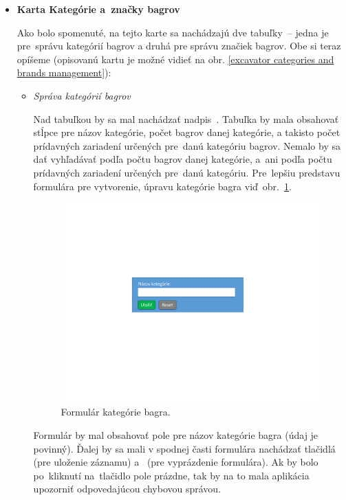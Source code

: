 \begin{itemize}
\item \textbf{Karta Kategórie a~značky bagrov}

Ako bolo spomenuté, na tejto karte sa nachádzajú dve tabuľky~-- jedna je pre~správu kategórií bagrov a druhá pre správu značiek bagrov. Obe si teraz opíšeme (opisovanú kartu je možné vidieť na obr. \ref{excavator categories and brands management}):

\begin{itemize}
\item \textit{Správa kategórií bagrov}

Nad tabuľkou by sa mal nachádzať nadpis~. Tabuľka by mala obsahovať stĺpce pre názov kategórie, počet bagrov danej kategórie, a takisto počet prídavných zariadení určených pre~danú kategóriu bagrov. Nemalo by sa dať vyhľadávať podľa počtu bagrov danej kategórie, a~ani podľa počtu prídavných zariadení určených pre~danú kategóriu. Pre~lepšiu predstavu formulára pre vytvorenie, úpravu kategórie bagra viď~obr.~\ref{excavator category form}.

\begin{figure}[H]\centering
\includegraphics[width=140mm]{../img/UI concept/excavator category form}
\caption{Formulár kategórie bagra.}
\label{excavator category form}
\end{figure}

Formulár by mal obsahovať pole pre názov kategórie bagra (údaj je povinný). Ďalej by sa mali v spodnej časti formulára nachádzať tlačidlá  (pre uloženie záznamu) a~ (pre vyprázdenie formulára). Ak by bolo po~kliknutí na~tlačidlo  pole prázdne, tak by na to mala aplikácia upozorniť odpovedajúcou chybovou správou.


\end{itemize}
\end{itemize}
